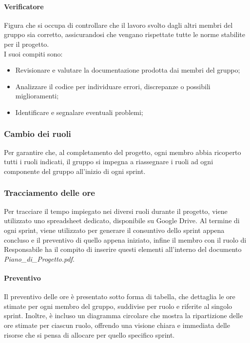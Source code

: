 \documentclass[10pt]{article}
\begin{document}
\begin{justify}
        \paragraph{Verificatore}
        Figura che si occupa di controllare che il lavoro svolto dagli altri membri del gruppo sia corretto, assicurandosi che vengano rispettate tutte le norme stabilite per il progetto.\\
        I suoi compiti sono:
        \begin{itemize}
            \item Revisionare e valutare la documentazione prodotta dai membri del gruppo;
            \item Analizzare il codice per individuare errori, discrepanze o possibili miglioramenti;
            \item Identificare e segnalare eventuali problemi;
        \end{itemize}

    \subsubsection{Cambio dei ruoli}
    Per garantire che, al completamento del progetto, ogni membro abbia ricoperto tutti i ruoli indicati, il gruppo si impegna a riassegnare i ruoli ad ogni componente del gruppo all'inizio di ogni sprint.

    \subsubsection{Tracciamento delle ore}
    Per tracciare il tempo impiegato nei diversi ruoli durante il progetto, viene utilizzato uno spreadsheet dedicato, disponibile su Google Drive. Al termine di ogni sprint, viene utilizzato per generare il consuntivo dello sprint appena concluso e il preventivo di quello appena iniziato, infine il membro con il ruolo di Responsabile ha il compito di inserire questi elementi all'interno del documento \textit{Piano\_di\_Progetto.pdf}.

        \paragraph{Preventivo}
        Il preventivo delle ore è presentato sotto forma di tabella, che dettaglia le ore stimate per ogni membro del gruppo, suddivise per ruolo e riferite al singolo sprint. Inoltre, è incluso un diagramma circolare che mostra la ripartizione delle ore stimate per ciascun ruolo, offrendo una visione chiara e immediata delle risorse che si pensa di allocare per quello specifico sprint.


\end{justify}
\end{document}
